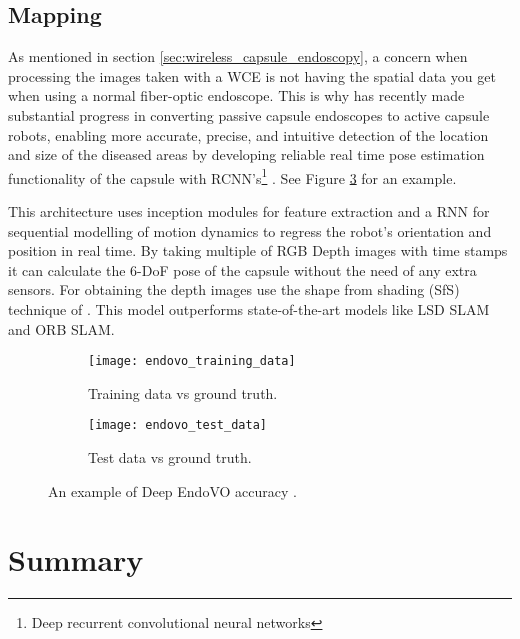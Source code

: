 \documentclass[thesis.tex]{subfiles}
\begin{document}
\subsection{Mapping} \label{sec:mapping}
As mentioned in section \ref{sec:wireless_capsule_endoscopy}, a concern when processing the images taken with a WCE is not having the spatial data you get when using a normal fiber-optic endoscope. This is why \citeauthor*{DeepEndoVO18} has recently made substantial progress in converting passive capsule endoscopes to active capsule robots, enabling more accurate, precise, and intuitive detection of the location and size of the diseased areas by developing reliable real time pose estimation functionality of the capsule with RCNN's\footnote{Deep recurrent convolutional neural networks} \cite{DeepEndoVO18}. See Figure \ref{fig:deep_endovo_example} for an example.

This architecture uses inception modules for feature extraction and a RNN for sequential modelling of motion dynamics to regress the robot's orientation and position in real time. By taking multiple of RGB Depth images with time stamps it can calculate the 6-DoF pose of the capsule without the need of any extra sensors. For obtaining the depth images \citeauthor*{DeepEndoVO18} use the shape from shading (SfS) technique of \citeauthor{ShapeShading94} \cite{ShapeShading94}. This model outperforms state-of-the-art models like LSD SLAM and ORB SLAM.

\begin{figure}[h] %
  \centering
  \begin{subfigure}[b]{0.4\linewidth}
    \centering
    \texttt{[image: endovo\_training\_data]}
    \caption{Training data vs ground truth.}
    \label{fig:endovo_training_data}
  \end{subfigure}
  \quad
  \begin{subfigure}[b]{0.4\linewidth}
    \centering
    \texttt{[image: endovo\_test\_data]}
    \caption{Test data vs ground truth.}
    \label{fig:endovo_test_data}
  \end{subfigure}
  \caption[An example of Deep EndoVO accuracy]{An example of Deep EndoVO accuracy \cite{DeepEndoVO18}.}
  \label{fig:deep_endovo_example}
\end{figure}



\section{Summary} \label{sec:C2-summary}
\end{document}
